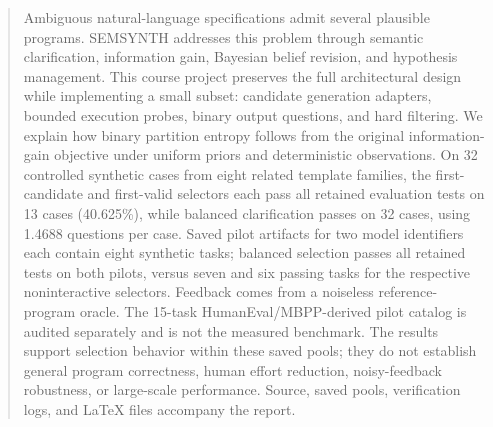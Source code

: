 \begin{abstract}
Ambiguous natural-language specifications admit several plausible programs. SEMSYNTH addresses this problem through semantic clarification, information gain, Bayesian belief revision, and hypothesis management. This course project preserves the full architectural design while implementing a small subset: candidate generation adapters, bounded execution probes, binary output questions, and hard filtering. We explain how binary partition entropy follows from the original information-gain objective under uniform priors and deterministic observations. On 32 controlled synthetic cases from eight related template families, the first-candidate and first-valid selectors each pass all retained evaluation tests on 13 cases (40.625\%), while balanced clarification passes on 32 cases, using 1.4688 questions per case. Saved pilot artifacts for two model identifiers each contain eight synthetic tasks; balanced selection passes all retained tests on both pilots, versus seven and six passing tasks for the respective noninteractive selectors. Feedback comes from a noiseless reference-program oracle. The 15-task HumanEval/MBPP-derived pilot catalog is audited separately and is not the measured benchmark. The results support selection behavior within these saved pools; they do not establish general program correctness, human effort reduction, noisy-feedback robustness, or large-scale performance. Source, saved pools, verification logs, and LaTeX files accompany the report.
\end{abstract}
